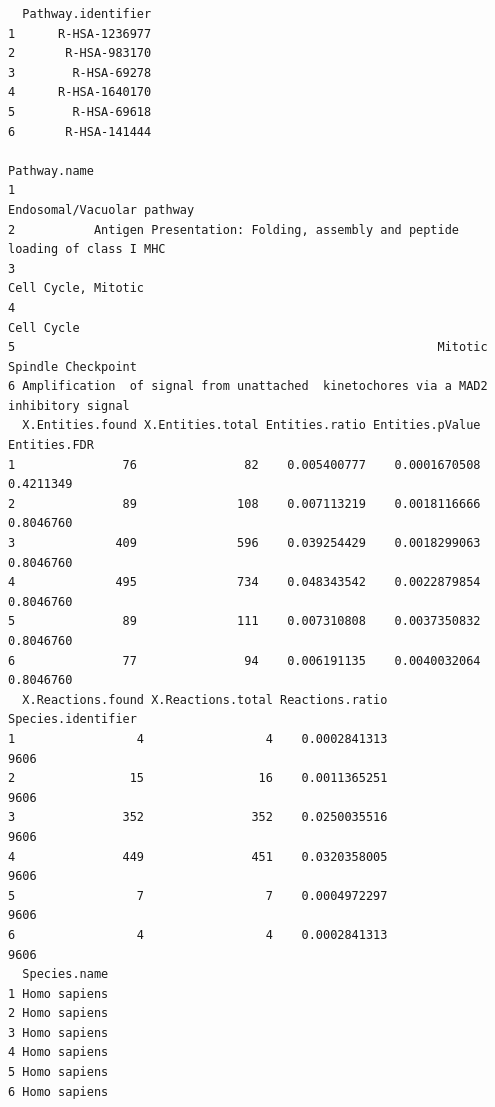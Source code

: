 \documentclass[
  letterpaper,
  DIV=11,
  numbers=noendperiod]{scrartcl}
\begin{document}
\begin{verbatim}
  Pathway.identifier
1      R-HSA-1236977
2       R-HSA-983170
3        R-HSA-69278
4      R-HSA-1640170
5        R-HSA-69618
6       R-HSA-141444
                                                                          Pathway.name
1                                                           Endosomal/Vacuolar pathway
2           Antigen Presentation: Folding, assembly and peptide loading of class I MHC
3                                                                  Cell Cycle, Mitotic
4                                                                           Cell Cycle
5                                                           Mitotic Spindle Checkpoint
6 Amplification  of signal from unattached  kinetochores via a MAD2  inhibitory signal
  X.Entities.found X.Entities.total Entities.ratio Entities.pValue Entities.FDR
1               76               82    0.005400777    0.0001670508    0.4211349
2               89              108    0.007113219    0.0018116666    0.8046760
3              409              596    0.039254429    0.0018299063    0.8046760
4              495              734    0.048343542    0.0022879854    0.8046760
5               89              111    0.007310808    0.0037350832    0.8046760
6               77               94    0.006191135    0.0040032064    0.8046760
  X.Reactions.found X.Reactions.total Reactions.ratio Species.identifier
1                 4                 4    0.0002841313               9606
2                15                16    0.0011365251               9606
3               352               352    0.0250035516               9606
4               449               451    0.0320358005               9606
5                 7                 7    0.0004972297               9606
6                 4                 4    0.0002841313               9606
  Species.name
1 Homo sapiens
2 Homo sapiens
3 Homo sapiens
4 Homo sapiens
5 Homo sapiens
6 Homo sapiens

\end{verbatim}
\end{document}
